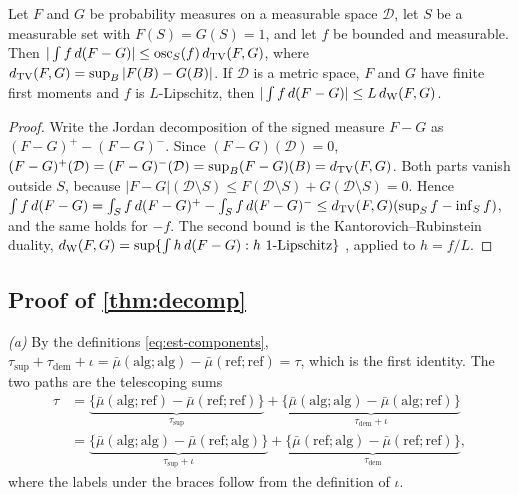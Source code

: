 \begin{lemma}\label{lem:app-signed}
Let $F$ and $G$ be probability measures on a measurable space $\mathcal D$, let $S$ be a measurable set with $F(S)=G(S)=1$, and let $f$ be bounded and measurable. Then $|\int f\,d(F-G)|\le\operatorname{osc}_S(f)\,d_{\mathrm{TV}}(F,G)$, where $d_{\mathrm{TV}}(F,G)=\sup_B|F(B)-G(B)|$. If $\mathcal D$ is a metric space, $F$ and $G$ have finite first moments and $f$ is $L$-Lipschitz, then $|\int f\,d(F-G)|\le L\,d_{\mathrm{W}}(F,G)$.
\end{lemma}

\begin{proof}
Write the Jordan decomposition of the signed measure $F-G$ as $(F-G)^+-(F-G)^-$. Since $(F-G)(\mathcal D)=0$, $(F-G)^+(\mathcal D)=(F-G)^-(\mathcal D)=\sup_B(F-G)(B)=d_{\mathrm{TV}}(F,G)$. Both parts vanish outside $S$, because $|F-G|(\mathcal D\setminus S)\le F(\mathcal D\setminus S)+G(\mathcal D\setminus S)=0$. Hence $\int f\,d(F-G)=\int_Sf\,d(F-G)^+-\int_Sf\,d(F-G)^-\le d_{\mathrm{TV}}(F,G)(\sup_Sf-\inf_Sf)$, and the same holds for $-f$. The second bound is the Kantorovich--Rubinstein duality, $d_{\mathrm{W}}(F,G)=\sup\{\int h\,d(F-G):h\text{ $1$-Lipschitz}\}$ \citep[Ch.~6]{villani2009}, applied to $h=f/L$.
\end{proof}

\subsection{Proof of \texorpdfstring{\cref{thm:decomp}}{the decomposition theorem}}\label{app:pf-decomp}

\emph{(a)} By the definitions \eqref{eq:est-components}, $\tau_{\mathrm{sup}}+\tau_{\mathrm{dem}}+\iota=\bar\mu(\mathrm{alg};\mathrm{alg})-\bar\mu(\mathrm{ref};\mathrm{ref})=\tau$, which is the first identity. The two paths are the telescoping sums
\[
\begin{aligned}
  \tau&=\underbrace{\{\bar\mu(\mathrm{alg};\mathrm{ref})-\bar\mu(\mathrm{ref};\mathrm{ref})\}}_{\tau_{\mathrm{sup}}}
  +\underbrace{\{\bar\mu(\mathrm{alg};\mathrm{alg})-\bar\mu(\mathrm{alg};\mathrm{ref})\}}_{\tau_{\mathrm{dem}}+\iota}\\
  &=\underbrace{\{\bar\mu(\mathrm{alg};\mathrm{alg})-\bar\mu(\mathrm{ref};\mathrm{alg})\}}_{\tau_{\mathrm{sup}}+\iota}
  +\underbrace{\{\bar\mu(\mathrm{ref};\mathrm{alg})-\bar\mu(\mathrm{ref};\mathrm{ref})\}}_{\tau_{\mathrm{dem}}},
\end{aligned}
\]
where the labels under the braces follow from the definition of $\iota$.

